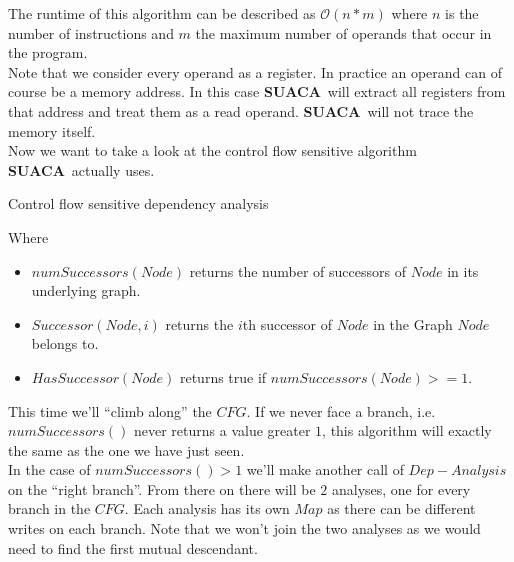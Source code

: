 \documentclass[a4paper,12pt,titlepage, twoside]{report}
\newcommand{\suaca}{\textbf{SUACA}}
\begin{document}
The runtime of this algorithm can be described as $\mathcal{O}(n*m)$ where $n$ is the number of instructions and $m$ the maximum number of operands that occur in the program.\\

Note that we consider every operand as a register. In practice an operand can of course be a memory address. In this case \suaca\ will extract all registers from that address and treat them as a read operand. \suaca\ will not trace the memory itself.\\

Now we want to take a look at the control flow sensitive algorithm \suaca\ actually uses. 

\begin{algorithm}[H]
    \SetAlgoLined
    \caption{Control flow sensitive dependency analysis}
    \label{alg:dep}
\end{algorithm}

Where
\begin{itemize}
    \item $numSuccessors(Node)$ returns the number of successors of $Node$ in its underlying graph.
    \item $Successor(Node, i)$ returns the $i$th successor of $Node$ in the Graph $Node$ belongs to.
    \item $HasSuccessor(Node)$ returns true if $numSuccessors(Node) >= 1$.
\end{itemize}

This time we'll ``climb along'' the $CFG$. If we never face a branch, i.e.\ $numSuccessors()$ never returns a value greater $1$, this algorithm will exactly the same as the one we have just seen.\\
In the case of $numSuccessors() > 1$ we'll make another call of $Dep-Analysis$ on the ``right branch''. From there on there will be $2$ analyses, one for every branch in the $CFG$. Each analysis has its own $Map$ as there can be different writes on each branch. Note that we won't join the two analyses as we would need to find the first mutual descendant.\\
\end{document}
